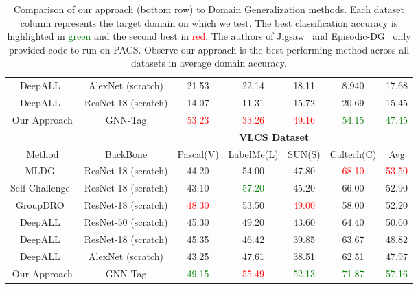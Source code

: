 \begin{table*}[ht]
\begin{center}
\begin{tabular}{ccccccc}
  DeepALL~\cite{Li:etal:ICCV17} & AlexNet (scratch)  & 21.53 & 22.14 & 18.11 &  8.940  & 17.68\\
  DeepALL~\cite{Li:etal:ICCV17} & ResNet-18 (scratch)  &  14.07 & 11.31 & 15.72 & 20.69 & 15.45 \\ 

  \hline
  Our Approach                       & GNN-Tag & \textcolor{red}{53.23} & \textcolor{red}{33.26} & \textcolor{red}{49.16} & \textcolor{green}{54.15} & \textcolor{green}{47.45}\\
  
  \hline
&          & \multicolumn{4}{c}{\bf VLCS Dataset~\cite{Fang:etal:ICCV13}} & \\
  Method & BackBone &   Pascal(V) & LabelMe(L) & SUN(S) & Caltech(C) & Avg\\
  \hline
  MLDG~\cite{Li:mini:etal:AAAI18}         & ResNet-18 (scratch)  & 44.20 & 54.00 & 47.80 & \textcolor{red}{68.10}  & \textcolor{red}{53.50} \\
    Self Challenge~\cite{Huang:etal:ECCV20} & ResNet-18 (scratch) & 43.10 & \textcolor{green}{57.20}  & 45.20 &  66.00 & 52.90 \\
  GroupDRO~\cite{Sagawa:etal:ICLR20}      & ResNet-18 (scratch)  & \textcolor{red}{48.30} & 53.50 & \textcolor{red}{49.00} & 58.00 & 52.20 \\

  DeepALL~\cite{Li:etal:ICCV17} & ResNet-50 (scratch) & 45.30 & 49.20 & 43.60 & 64.40 & 50.60 \\
  DeepALL~\cite{Li:etal:ICCV17} & ResNet-18 (scratch)  & 45.35 & 46.42 & 39.85 & 63.67 & 48.82 \\
  DeepALL~\cite{Li:etal:ICCV17} & AlexNet (scratch)    & 43.25 & 47.61 & 38.51 & 62.51 & 47.97 \\

  \hline
  Our Approach                       & GNN-Tag & \textcolor{green}{49.15} & \textcolor{red}{55.49} & \textcolor{green}{52.13} &  \textcolor{green}{71.87} & \textcolor{green}{57.16} \\
  \bottomrule
\end{tabular}
\end{center}
\caption{Comparison of our approach (bottom row) to Domain Generalization methods. Each dataset column represents the target domain on which we test. The best classification accuracy is highlighted in \textcolor{green}{green} and the second best in \textcolor{red}{red}. The authors of Jigsaw~\cite{Carlucci:mini:etal:CVPR19} and  Episodic-DG~\cite{Li:mini:etal:ICCV19} only provided code to run on PACS.  Observe our approach is the best performing method across all datasets in average domain accuracy. }
\label{tbl:sota}
\end{table*}
